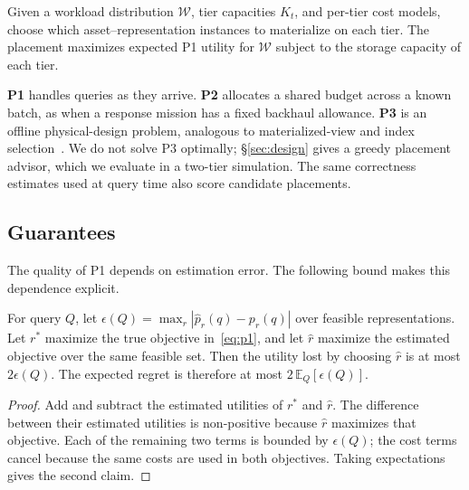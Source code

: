 \begin{definition}
Given a workload distribution $\mathcal{W}$, tier capacities $K_t$, and
per-tier cost models, choose which asset--representation instances to
materialize on each tier. The placement maximizes expected P1 utility for
$\mathcal{W}$ subject to the storage capacity of each tier.
\end{definition}

\textbf{P1} handles queries as they arrive. \textbf{P2} allocates a shared budget across a known
batch, as when a response mission has a fixed backhaul allowance. \textbf{P3} is an
offline physical-design problem, analogous to materialized-view and index
selection~\cite{harinarayan1996cubes,chaudhuri1997autoadmin}. We do not solve P3
optimally; \S\ref{sec:design} gives a greedy placement advisor, which we evaluate in a
two-tier simulation. The same
correctness estimates used at query time also score candidate placements.

\subsection{Guarantees}

The quality of P1 depends on estimation error. The following bound makes this
dependence explicit.

\begin{proposition}
\label{prop:regret}
For query $Q$, let
$\epsilon(Q)=\max_r|\widehat p_r(q)-p_r(q)|$ over feasible representations.
Let $r^*$ maximize the true objective in~\eqref{eq:p1}, and let $\widehat r$
maximize the estimated objective over the same feasible set. Then the utility
lost by choosing $\widehat r$ is at most $2\epsilon(Q)$. The expected regret
is therefore at most $2\,\mathbb{E}_Q[\epsilon(Q)]$.
\end{proposition}

\begin{proof}
Add and subtract the estimated utilities of $r^*$ and $\widehat r$. The
difference between their estimated utilities is non-positive because
$\widehat r$ maximizes that objective. Each of the remaining two terms is
bounded by $\epsilon(Q)$; the cost terms cancel because the same costs are
used in both objectives. Taking expectations gives the second claim.
\end{proof}

